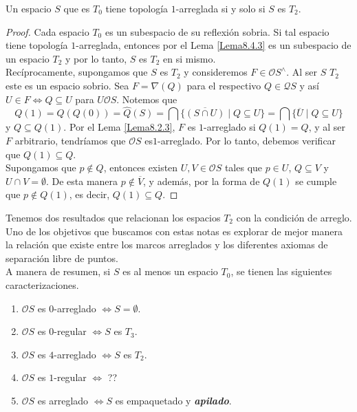 \begin{thm}\label{Teorema8.4.4}
    Un espacio $S$ que es $T_0$ tiene topología $1$-arreglada si y solo si $S$ es $T_2$.
\end{thm}

\begin{proof}
    Cada espacio $T_0$ es un subespacio de su reflexión sobria. Si tal espacio tiene topología $1$-arreglada, entonces por el Lema \ref{Lema8.4.3} es un subespacio de un espacio $T_2$ y por lo tanto, $S$ es $T_2$ en si mismo.\\

    Recíprocamente, supongamos que $S$ es $T_2$ y consideremos $F\in \mathcal{O}S^\wedge$. Al ser $S$ $T_2$ este es un espacio sobrio. Sea $F=\nabla(Q)$ para el respectivo $Q\in \mathcal{Q}S$ y así $U\in F\Leftrightarrow Q\subseteq U$ para $U\mathcal{O}S$. Notemos que 
    \[
    Q(1)=\hat{Q}(Q(0))=\hat{Q}(S)=\bigcap\{\overline{(S\cap U)}\mid Q\subseteq U\}=\bigcap\{\overline{U}\mid Q\subseteq U\}
    \]
    y $Q\subseteq Q(1)$. Por el Lema \ref{Lema8.2.3},  $F$ es $1$-arreglado si $Q(1)=Q$, y al ser $F$ arbitrario, tendríamos que $\mathcal{O}S$ es$1$-arreglado. Por lo tanto, debemos verificar que $Q(1)\subseteq Q$.\\

    Supongamos que $p\notin Q$, entonces existen $U, V\in \mathcal{O}S$ tales que $p\in U$, $Q\subseteq V$ y $U\cap V=\emptyset$. De esta manera $p\notin \overline{V}$, y además, por la forma de $Q(1)$ se cumple que $p\notin Q(1)$, es decir, $Q(1)\subseteq Q$.
\end{proof}

Tenemos dos resultados que relacionan los espacios $T_2$ con la condición de arreglo. Uno de los objetivos que buscamos con estas notas es explorar de mejor manera la relación que existe entre los marcos arreglados y los diferentes axiomas de separación libre de puntos.\\

A manera de resumen, si $S$ es al menos un espacio $T_0$, se tienen las siguientes caracterizaciones.

\begin{enumerate}
    \item $\mathcal{O}S$ es $0$-arreglado $\Leftrightarrow S=\emptyset$.
    \item $\mathcal{O}S$ es $0$-regular $\Leftrightarrow S$ es $T_3$.
    \item $\mathcal{O}S$ es $4$-arreglado $\Leftrightarrow S$ es $T_2$.
    \item $\mathcal{O}S$ es $1$-regular $\Leftrightarrow$ ??
    \item $\mathcal{O}S$ es arreglado $\Leftrightarrow S$ es empaquetado y \textbf{\emph{apilado}}. 
\end{enumerate}

